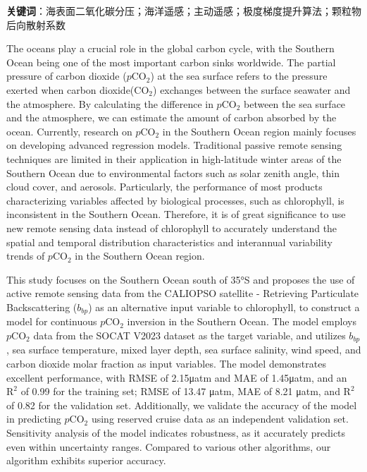 \textbf{关键词}：海表面二氧化碳分压；海洋遥感；主动遥感；极度梯度提升算法；颗粒物后向散射系数

\cleardoublepage
The oceans play a crucial role in the global carbon cycle, with the Southern Ocean being one of the most important carbon sinks worldwide. The partial pressure of carbon dioxide ($p\mathrm{CO_2}$) at the sea surface refers to the pressure exerted when carbon dioxide($\mathrm{CO_2}$) exchanges between the surface seawater and the atmosphere. By calculating the difference in $p\mathrm{CO_2}$ between the sea surface and the atmosphere, we can estimate the amount of carbon absorbed by the ocean. Currently, research on $p\mathrm{CO_2}$ in the Southern Ocean region mainly focuses on developing advanced regression models. Traditional passive remote sensing techniques are limited in their application in high-latitude winter areas of the Southern Ocean due to environmental factors such as solar zenith angle, thin cloud cover, and aerosols. Particularly, the performance of most products characterizing variables affected by biological processes, such as chlorophyll, is inconsistent in the Southern Ocean. Therefore, it is of great significance to use new remote sensing data instead of chlorophyll to accurately understand the spatial and temporal distribution characteristics and interannual variability trends of $p\mathrm{CO_2}$ in the Southern Ocean region.

This study focuses on the Southern Ocean south of 35°S and proposes the use of active remote sensing data from the CALIOPSO satellite - Retrieving Particulate Backscattering ($b_{bp}$) as an alternative input variable to chlorophyll, to construct a model for continuous $p\mathrm{CO_2}$ inversion in the Southern Ocean. The model employs $p\mathrm{CO_2}$ data from the SOCAT V2023 dataset as the target variable, and utilizes $b_{bp}$, sea surface temperature, mixed layer depth, sea surface salinity, wind speed, and carbon dioxide molar fraction as input variables. The model demonstrates excellent performance, with RMSE of 2.15μatm and MAE of 1.45μatm, and an $\mathrm{R^2}$ of 0.99 for the training set; RMSE of 13.47 μatm, MAE of 8.21 μatm, and $\mathrm{R^2}$ of 0.82 for the validation set. Additionally, we validate the accuracy of the model in predicting $p\mathrm{CO_2}$ using reserved cruise data as an independent validation set. Sensitivity analysis of the model indicates robustness, as it accurately predicts even within uncertainty ranges. Compared to various other algorithms, our algorithm exhibits superior accuracy.

